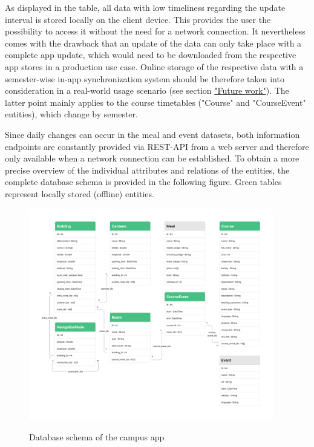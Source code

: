 As displayed in the table, all data with low timeliness regarding the update interval is stored locally on the client device. This provides the user the possibility to access it without the need for a network connection. It nevertheless comes with the drawback that an update of the data can only take place with a complete app update, which would need to be downloaded from the respective app stores in a production use case. Online storage of the respective data with a semester-wise in-app synchronization system should be therefore taken into consideration in a real-world usage scenario (see section \hyperref[sec:future_work]{"Future work"}). The latter point mainly applies to the course timetables ("Course" and "CourseEvent" entities), which change by semester.

Since daily changes can occur in the meal and event datasets, both information endpoints are constantly provided via REST-API from a web server and therefore only available when a network connection can be established. To obtain a more precise overview of the individual attributes and relations of the entities, the complete database schema is provided in the following figure. Green tables represent locally stored (offline) entities.

\begin{figure}[H]
	\centering
	\includegraphics[width=0.95\textwidth]{images/database_schema.png}\\
	\caption{Database schema of the campus app}
	\label{fig:database_schema}
\end{figure}

